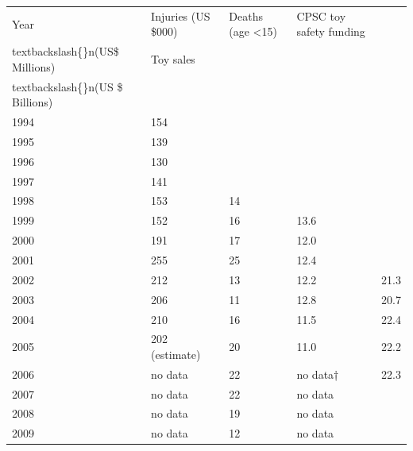\documentclass{article}
\begin{document}
\begin{tabular}{lllll}
\toprule
Year & Injuries (US \$000) & Deaths (age <15) & CPSC toy safety funding\\textbackslash\{\}n(US\$ Millions) & Toy sales\\textbackslash\{\}n(US \$ Billions) \\
\midrule
1994 & 154 &  &  &  \\
1995 & 139 &  &  &  \\
1996 & 130 &  &  &  \\
1997 & 141 &  &  &  \\
1998 & 153 & 14 &  &  \\
1999 & 152 & 16 & 13.6 &  \\
2000 & 191 & 17 & 12.0 &  \\
2001 & 255 & 25 & 12.4 &  \\
2002 & 212 & 13 & 12.2 & 21.3 \\
2003 & 206 & 11 & 12.8 & 20.7 \\
2004 & 210 & 16 & 11.5 & 22.4 \\
2005 & 202 (estimate) & 20 & 11.0 & 22.2 \\
2006 & no data & 22 & no data† & 22.3 \\
2007 & no data & 22 & no data &  \\
2008 & no data & 19 & no data &  \\
2009 & no data & 12 & no data &  \\
\bottomrule
\end{tabular}
\end{document}
